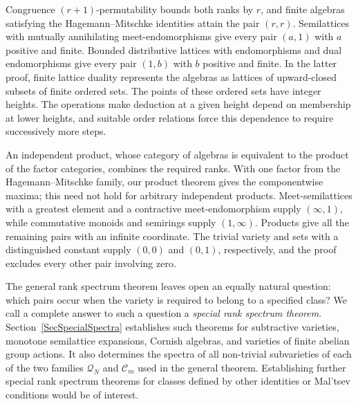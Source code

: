 \documentclass[12pt,english]{amsart}
\theoremstyle{definition}
\numberwithin{equation}{section}
\theoremstyle{remark}
\begin{document}
Congruence $(r+1)$-permutability bounds both ranks by $r$, and finite algebras satisfying the Hagemann--Mitschke identities attain the pair $(r,r)$. Semilattices with mutually annihilating meet-endomorphisms give every pair $(a,1)$ with $a$ positive and finite. Bounded distributive lattices with endomorphisms and dual endomorphisms give every pair $(1,b)$ with $b$ positive and finite. In the latter proof, finite lattice duality represents the algebras as lattices of upward-closed subsets of finite ordered sets. The points of these ordered sets have integer heights. The operations make deduction at a given height depend on membership at lower heights, and suitable order relations force this dependence to require successively more steps.

An independent product, whose category of algebras is equivalent to the product of the factor categories, combines the required ranks. With one factor from the Hagemann--Mitschke family, our product theorem gives the componentwise maxima; this need not hold for arbitrary independent products. Meet-semilattices with a greatest element and a contractive meet-endomorphism supply $(\infty,1)$, while commutative monoids and semirings supply $(1,\infty)$. Products give all the remaining pairs with an infinite coordinate. The trivial variety and sets with a distinguished constant supply $(0,0)$ and $(0,1)$, respectively, and the proof excludes every other pair involving zero.

The general rank spectrum theorem leaves open an equally natural question: which pairs occur when the variety is required to belong to a specified class? We call a complete answer to such a question a \emph{special rank spectrum theorem}. Section~\ref{SecSpecialSpectra} establishes such theorems for subtractive varieties, monotone semilattice expansions, Cornish algebras, and varieties of finite abelian group actions. It also determines the spectra of all non-trivial subvarieties of each of the two families $\mathcal Q_N$ and $\mathcal C_m$ used in the general theorem. Establishing further special rank spectrum theorems for classes defined by other identities or Mal'tsev conditions would be of interest.
\end{document}
